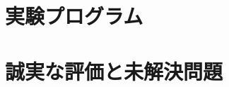 \documentclass[11pt,a4paper]{report}
\theoremstyle{remark}
\begin{document}
\part{実験プログラム}

\part{誠実な評価と未解決問題}
\end{document}
